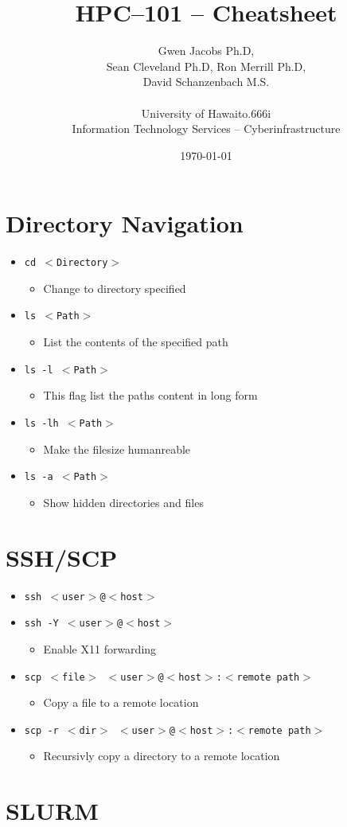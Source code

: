 \documentclass[11pt,twocolumn]{article}
\newcommand{\lft}{$<$}
\newcommand{\rht}{$>$}
\newcommand{\pth}[1]{{\lft}#1{\rht}}
\newlength{\okinalen}
\newcommand{\okina}{\hbox to.666\okinalen{\hss`\hss}}
\newcommand{\hawaii}{Hawai{\okina}i}
\newcommand{\ci}{Cyberinfrastructure}
\newcommand{\desc}[1]{\small \begin{itemize}\item[]#1\end{itemize}}
\begin{document}
\setlength{\droptitle}{-10em}
\title{HPC--101 -- Cheatsheet \vspace{-2ex}}
\date{\today}
\author{Gwen Jacobs Ph.D,\\Sean Cleveland Ph.D, Ron Merrill Ph.D,\\David Schanzenbach M.S.\\~\\University of {\hawaii}\\Information Technology Services -- {\ci}}
\maketitle
\section{Directory Navigation}
\begin{itemize}
\item[] \texttt{cd {\pth{Directory}}}\desc{Change to directory specified}
\item[] \texttt{ls {\pth{Path}}}\desc{List the contents of the specified path}
\item[] \texttt{ls -l {\pth{Path}}}\desc{This flag list the paths content in long form}
\item[] \texttt{ls -lh {\pth{Path}}}\desc{Make the filesize humanreable}
\item[] \texttt{ls -a {\pth{Path}}}\desc{Show hidden directories and files}
\end{itemize}

\section{SSH/SCP}
\begin{itemize}
\item[] \texttt{ssh {\lft}user{\rht}@{\lft}host{\rht}}
\item[] \texttt{ssh -Y {\lft}user{\rht}@{\lft}host{\rht}}\desc{Enable X11 forwarding}
\item[] \texttt{scp~{\lft}file{\rht}~{\lft}user{\rht}@{\lft}host{\rht}:{\lft}remote~path{\rht}}\desc{Copy a file to a remote location}
\item[] \texttt{scp~-r~{\lft}dir{\rht}~{\lft}user{\rht}@{\lft}host{\rht}:{\lft}remote~path{\rht}}\desc{Recursivly copy a directory to a remote location}
\end{itemize}

\section{SLURM}
\end{document}
